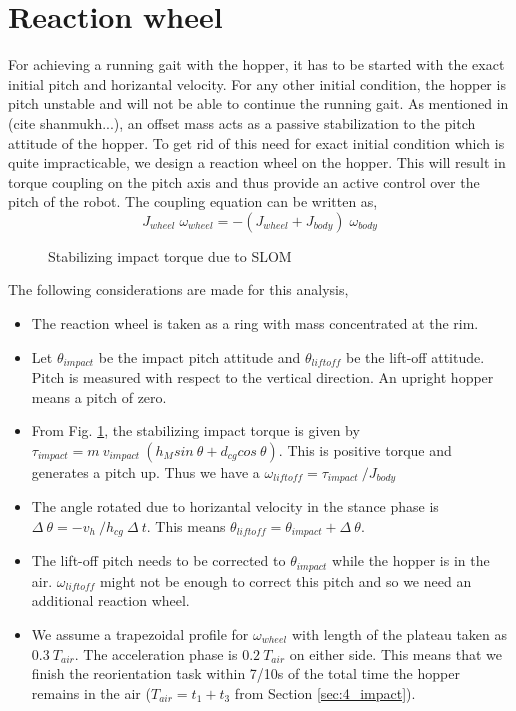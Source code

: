 \section{Reaction wheel}
For achieving a running gait with the hopper, it has to be started with the exact initial pitch and horizantal velocity.
For any other initial condition, the hopper is pitch unstable and will not be able to continue the running gait.
As mentioned in (cite shanmukh...), an offset mass acts as a passive stabilization to the pitch attitude of the hopper.
To get rid of this need for exact initial condition which is quite impracticable, we design a reaction wheel on the hopper.
This will result in torque coupling on the pitch axis and thus provide an active control over the pitch of the robot.
The coupling equation can be written as,
\begin{equation}
J_{wheel}\;\omega_{wheel} = -(J_{wheel} + J_{body})\;\omega_{body}
\end{equation}
\begin{figure}[!h]
\centering
\caption{Stabilizing impact torque due to SLOM}
\label{fig:4_rewac}
\end{figure}
The following considerations are made for this analysis,
\begin{itemize}
\item
The reaction wheel is taken as a ring with mass concentrated at the rim.
\item
Let $\theta_{impact}$ be the impact pitch attitude and $\theta_{liftoff}$ be the lift-off attitude. Pitch is measured with respect to
the vertical direction. An upright hopper means a pitch of zero.
\item
From Fig. \ref{fig:4_rewac}, the stabilizing impact torque is given by $\tau_{impact} = m\:v_{impact}\:(h_M sin\:\theta + d_{cg}
cos\:\theta)$. This is positive torque and generates a pitch up. Thus we have a $\omega_{liftoff} = \tau_{impact}\:/J_{body}$
\item
The angle rotated due to horizantal velocity in the stance phase is $\Delta\:\theta = -v_h\:/h_{cg}\:\Delta\:t$. This means
$\theta_{liftoff} = \theta_{impact} + \Delta\:\theta$.
\item
The lift-off pitch needs to be corrected to $\theta_{impact}$ while the hopper is in the air. $\omega_{liftoff}$ might not be enough
to correct this pitch and so we need an additional reaction wheel.
\item
We assume a trapezoidal profile for $\omega_{wheel}$ with length of the plateau taken as $0.3\:T_{air}$. The acceleration phase is
$0.2\:T_{air}$ on either side. This means that we finish the reorientation task within 7/10s of the total time the hopper remains in
the air ($T_{air} = t_1 + t_3$ from Section \ref{sec:4_impact}).
\end{itemize}

